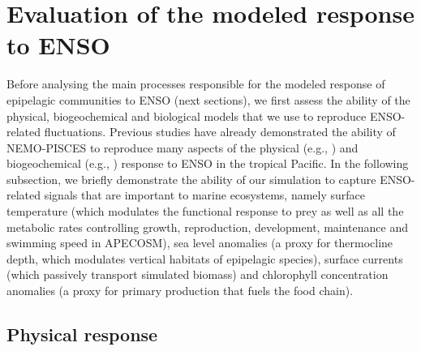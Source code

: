 
\section{Evaluation of the modeled response to ENSO}
\label{sec:model-val}

Before analysing the main processes responsible for the modeled response of epipelagic communities to ENSO (next sections), we first assess the ability of the physical, biogeochemical and biological models that we use to reproduce ENSO-related fluctuations. Previous studies have already demonstrated the ability of NEMO-PISCES to reproduce many aspects of the physical (e.g., \citealt{vialardModelStudyOceanic2001, lengaigneMechanismsControllingWarm2012, drushkaProcessesDrivingIntraseasonal2015, puyModulationEquatorialPacific2019}) and biogeochemical (e.g., \citealt{ masottiLargescaleShiftsPhytoplankton2011,gorguesRevisitingNina19982010, martinezReconstructingGlobalChlorophylla2020}) response to ENSO in the tropical Pacific. In the following subsection, we briefly demonstrate the ability of our simulation to capture ENSO-related signals that are important to marine ecosystems, namely surface temperature (which modulates the functional response to prey as well as all the metabolic rates controlling growth, reproduction, development, maintenance and swimming speed in APECOSM), sea level anomalies (a proxy for thermocline depth, which modulates vertical habitats of epipelagic species), surface currents (which passively transport simulated biomass) and chlorophyll concentration anomalies (a proxy for primary production that fuels the food chain).

\subsection{Physical response}

